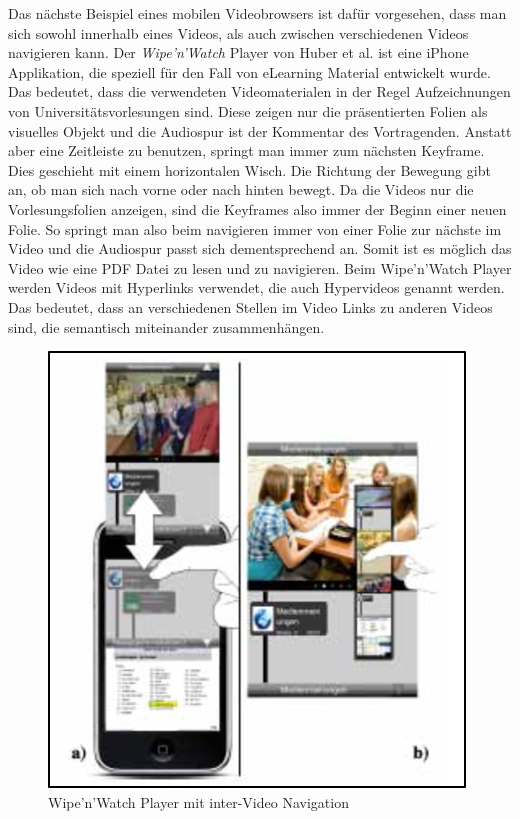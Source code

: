 \documentclass[11pt,a4paper]{report}
\begin{document}
Das nächste Beispiel eines mobilen Videobrowsers ist dafür vorgesehen, dass man sich sowohl innerhalb eines Videos, als auch zwischen verschiedenen Videos navigieren kann. Der \emph{Wipe’n’Watch} Player von Huber et al. \cite{huber2010wipe} ist eine iPhone Applikation, die speziell für den Fall von eLearning Material entwickelt wurde. Das bedeutet, dass die verwendeten Videomaterialen in der Regel Aufzeichnungen von Universitätsvorlesungen sind. Diese zeigen nur die präsentierten Folien als visuelles Objekt und die Audiospur ist der Kommentar des Vortragenden. Anstatt aber eine Zeitleiste zu benutzen, springt man immer zum nächsten Keyframe. Dies geschieht mit einem horizontalen Wisch. Die Richtung der Bewegung gibt an, ob man sich nach vorne oder nach hinten bewegt. Da die Videos nur die Vorlesungsfolien anzeigen, sind die Keyframes also immer der Beginn einer neuen Folie. So springt man also beim navigieren immer von einer Folie zur nächste im Video und die Audiospur passt sich dementsprechend an. Somit ist es möglich das Video wie eine PDF Datei zu lesen und zu navigieren. Beim Wipe’n’Watch Player werden Videos mit Hyperlinks verwendet, die auch Hypervideos genannt werden. Das bedeutet, dass an verschiedenen Stellen im Video Links zu anderen Videos sind, die semantisch miteinander zusammenhängen.
\begin{figure}[h]
\begin{center}
\includegraphics[scale=1.2]{./images/14.png}
\caption{Wipe'n'Watch Player mit inter-Video Navigation \cite{huber2010wipe}}
\label{wipenwatch}
\end{center}
\end{figure}
\end{document}

